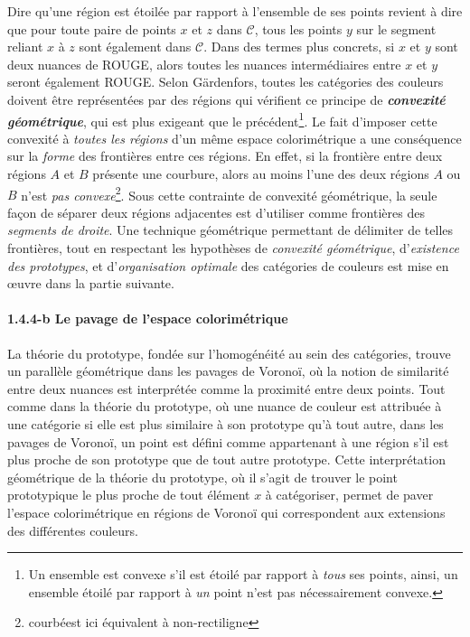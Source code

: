 \documentclass{article}
\newcommand{\bolditalic}[1]{\textbf{\textit{#1}}}
\begin{document}
	Dire qu’une région est étoilée par rapport à l’ensemble de ses points revient à dire que pour toute paire de points $x$ et $z$ dans $\mathcal{C}$, tous les points $y$ sur le segment reliant $x$ à $z$ sont également dans $\mathcal{C}$. Dans des termes plus concrets, si $x$ et $y$ sont deux nuances de ROUGE, alors toutes les nuances intermédiaires entre $x$ et $y$ seront également ROUGE. Selon Gärdenfors, toutes les catégories des couleurs doivent être représentées par des régions qui vérifient ce principe de \bolditalic{convexité géométrique}, qui est plus exigeant que le précédent\footnote{Un ensemble est convexe s'il est étoilé par rapport à \textit{tous} ses points, ainsi, un ensemble étoilé par rapport à \textit{un} point n’est pas nécessairement convexe.}. Le fait d'imposer cette convexité à \textit{toutes les régions} d'un même espace colorimétrique a une conséquence sur la \textit{forme} des frontières entre ces régions. En effet, si la frontière entre deux régions $A$ et $B$ présente une courbure, alors au moins l'une des deux régions $A$ ou $B$ n’est \textit{pas convexe}\footnote{ \og courbé\fg est ici équivalent à \og non-rectiligne \fg}. Sous cette contrainte de convexité géométrique, la seule façon de séparer deux régions adjacentes est d’utiliser comme frontières des \textit{segments de droite}. Une technique géométrique permettant de délimiter de telles frontières, tout en respectant les hypothèses de \textit{convexité géométrique}, d’\textit{existence des prototypes}, et d’\textit{organisation optimale} des catégories de couleurs est mise en œuvre dans la partie suivante.

\paragraph{1.4.4-b Le pavage de l’espace colorimétrique}\mbox{} 

 La théorie du prototype, fondée sur l’homogénéité au sein des catégories, trouve un parallèle géométrique dans les pavages de Voronoï, où la notion de similarité entre deux nuances est interprétée comme la proximité entre deux points. Tout comme dans la théorie du prototype, où une nuance de couleur est attribuée à une catégorie si elle est plus similaire à son prototype qu’à tout autre, dans les pavages de Voronoï, un point est défini comme appartenant à une région s’il est plus proche de son prototype que de tout autre prototype. Cette interprétation géométrique de la théorie du prototype, où il s’agit de trouver le point prototypique le plus proche de tout élément \( x \) à catégoriser, permet de paver l’espace colorimétrique en régions de Voronoï qui correspondent aux extensions des différentes couleurs.
\end{document}
